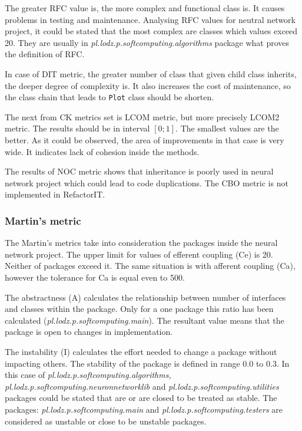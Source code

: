 The greater \ac{RFC} value is, the more complex and functional class is. It causes problems in testing and maintenance. Analysing \ac{RFC} values for neutral network project, it could be stated that the most complex are classes which values exceed 20. They are usually in \textit{pl.lodz.p.softcomputing.algorithms} package what proves the definition of \ac{RFC}.       

In case of \ac{DIT} metric, the greater number of class that given child class inherits, the deeper degree of complexity is. It also increases the cost of maintenance, so the class chain that leads to \texttt{Plot} class should be shorten. 

The next from \ac{CK metrics} set is \ac{LCOM} metric, but more precisely LCOM2 metric. The results should be in interval $[0;1]$. The smallest values are the better. As it could be observed, the area of improvements in that case is very wide. It indicates lack of cohesion inside the methods.  

The results of \ac{NOC} metric shows that inheritance is poorly used in neural network project which could lead to code duplications. The \ac{CBO} metric is not implemented in RefactorIT.

\subsubsection*{Martin's metric}
The Martin's metrics take into consideration the packages inside the neural network project. The upper limit for values of efferent coupling (\ac{Ce}) is 20. Neither of packages exceed it. The same situation is with afferent coupling (\ac{Ca}), however the tolerance for \ac{Ca} is equal even to 500. 

The abstractness (\ac{A}) calculates the relationship between number of interfaces and classes within the package. Only for a one package this ratio has been calculated (\textit{pl.lodz.p.soft\-com\-pu\-ting.main}). The resultant value means that the package is open to changes in implementation.

The instability (\ac{I}) calculates the effort needed to change a package without impacting others. The stability of the package is defined in range 0.0 to 0.3. In this case of \textit{pl.lodz.p.soft\-com\-pu\-ting.al\-go\-rithms, pl.lodz.p.soft\-com\-pu\-ting.neu\-ron\-net\-work\-lib} and \textit{pl.\-lodz.\-p.\-soft\-com\-pu\-ting.u\-ti\-li\-ties} packages could be stated that are or are closed to be treated as stable. The packages: \textit{pl.lodz.p.soft\-com\-pu\-ting.main} and \textit{pl.lodz.p.soft\-com\-pu\-ting.tes\-ters} are considered as unstable or close to be unstable packages.

